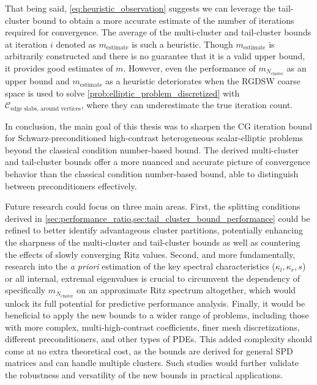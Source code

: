 That being said, \cref{eq:heuristic_observation} suggests we can leverage the tail-cluster bound to obtain a more accurate estimate of the number of iterations required for convergence. The average of the multi-cluster and tail-cluster bounds at iteration $i$ denoted as $m_{\text{estimate}}$ is such a heuristic. Though $m_{\text{estimate}}$ is arbitrarily constructed and there is no guarantee that it is a valid upper bound, it provides good estimates of $m$. However, even the performance of $m_{N_{\text{cluster}}}$ as an upper bound and $m_{\text{estimate}}$ as a heuristic deteriorates when the RGDSW coarse space is used to solve \cref{prob:elliptic_problem_discretized} with $\mathcal{C}_{\text{edge slabs, around vertices}}$, where they can underestimate the true iteration count.

In conclusion, the main goal of this thesis was to sharpen the CG iteration bound for Schwarz-preconditioned high-contrast heterogeneous scalar-elliptic problems beyond the classical condition number-based bound. The derived multi-cluster and tail-cluster bounds offer a more nuanced and accurate picture of convergence behavior than the classical condition number-based bound, able to distinguish between preconditioners effectively.

Future research could focus on three main areas. First, the splitting conditions derived in \cref{sec:performance_ratio,sec:tail_cluster_bound_performance} could be refined to better identify advantageous cluster partitions, potentially enhancing the sharpness of the multi-cluster and tail-cluster bounds as well as countering the effects of slowly converging Ritz values.  Second, and more fundamentally, research into the \textit{a priori} estimation of the key spectral characteristics ($\kappa_l, \kappa_r, s$) or all internal, extremal eigenvalues is crucial to circumvent the dependency of specifically $m_{N_{\text{cluster}}}$ on an approximate Ritz spectrum altogether, which would unlock its full potential for predictive performance analysis. Finally, it would be beneficial to apply the new bounds to a wider range of problems, including those with more complex, multi-high-contrast coefficients, finer mesh discretizations, different preconditioners, and other types of PDEs. This added complexity should come at no extra theoretical cost, as the bounds are derived for general SPD matrices and can handle multiple clusters. Such studies would further validate the robustness and versatility of the new bounds in practical applications.